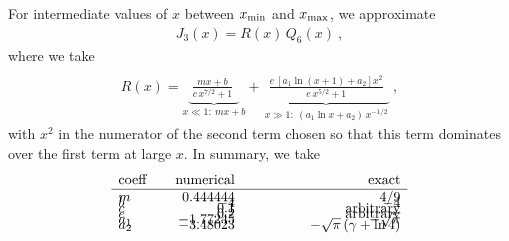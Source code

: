 \documentclass[preprint,12pt,eqsecnum,nofootinbib,amsmath,amssymb]{revtex4}
\begin{document}
For intermediate values of $x$ between $x_{\rm min}$ and
 $x_{\rm max}$, we approximate
\begin{eqnarray}
  J_3(x) = R(x) \, Q_6(x) \ ,
\end{eqnarray}
where we take
\begin{eqnarray}
\\\nonumber
  R(x)= 
  \underbrace{~\frac{m x + b}{c\, x^{7/2} + 1}~~}_{x\ll 1:~mx+b}  + 
  \underbrace{~~\frac{e\,[a_1\ln(x+1)+a_2]x^2}{e\, x^{5/2} +1}~~}_{x\gg 1:~ 
  (a_1\ln x + a_2)\, x^{-1/2}}\ ,
\end{eqnarray}
with $x^2$ in the numerator of the second term chosen so that this 
term dominates over the first term at large $x$. In summary, we take
\begin{eqnarray}
\begin{array}{lrr}
  {\rm coeff} ~~~ & {\rm numerical} & \hskip3cm {\rm exact}    \\ \hline
  m               &  0.444444          &  4/9                  \\[-8pt]
  b               &  -4                &  -4                   \\[-8pt]
  c               &  0.1               &  {\rm arbitrary}      \\[-8pt]
  e               &  0.2               &  {\rm arbitrary}      \\[-8pt]
  a_1             & -1.77245           &  -\sqrt{\pi}          \\[-8pt]
  a_2             & -3.48023           &  -\sqrt{\pi}\,(\gamma+\ln4)
\end{array}
\end{eqnarray}
\end{document}
